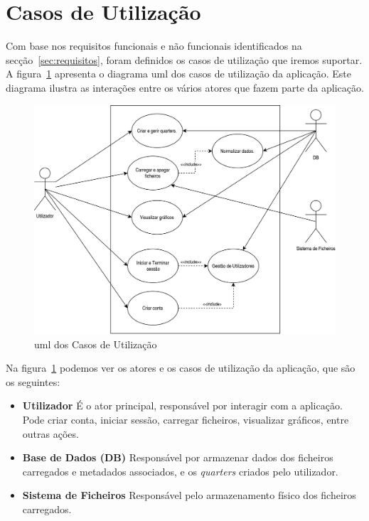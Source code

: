 \section{Casos de Utilização}
\label{ch:casosUtilizacao}

Com base nos requisitos funcionais e não funcionais identificados na secção~\ref{sec:requisitos}, foram definidos os casos de utilização que iremos suportar. A figura~\ref{fig:umlCasosUtilizacao} apresenta o diagrama \gls{uml} dos casos de utilização da aplicação. Este diagrama ilustra as interações entre os vários atores que fazem parte da aplicação.

\begin{figure}[h]
\centering
\includegraphics[max width=\textwidth]{./img/usecase_uml}
\caption{\gls{uml} dos Casos de Utilização}
\label{fig:umlCasosUtilizacao}
\end{figure}

Na figura~\ref{fig:umlCasosUtilizacao} podemos ver os atores e os casos de utilização da aplicação, que são os seguintes:
\begin{itemize}
    \item \textbf{Utilizador} É o ator principal, responsável por interagir com a aplicação. Pode criar conta, iniciar sessão, carregar ficheiros, visualizar gráficos, entre outras ações.
    \item \textbf{Base de Dados (DB)} Responsável por armazenar dados dos ficheiros carregados e metadados associados, e os \textit{quarters} criados pelo utilizador.
    \item \textbf{Sistema de Ficheiros} Responsável pelo armazenamento físico dos ficheiros carregados.
\end{itemize}


